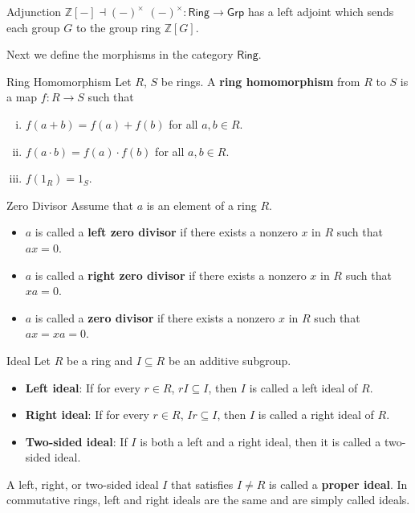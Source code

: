 \begin{proposition}{Adjunction $\mathbb{Z}\left[-\right]\dashv \left(-\right)^\times$}{}
    $(-)^\times:\mathsf{Ring}\to\mathsf{Grp}$ has a left adjoint which sends each group $G$ to the group ring $\mathbb{Z}\left[G\right]$.
\end{proposition}


Next we define the morphisms in the category $\mathsf{Ring}$.
\begin{definition}{Ring Homomorphism}{}
    Let $R$, $S$ be rings. A \textbf{ring homomorphism} from $R$ to $S$ is a map $f:R\to S$ such that
    \begin{enumerate}[(i)]
        \item $f(a+b)=f(a)+f(b)$ for all $a,b\in R$.
        \item $f(a\cdot b)=f(a)\cdot f(b)$ for all $a,b\in R$.
        \item $f(1_R)=1_S$.
    \end{enumerate}
\end{definition}




\begin{definition}{Zero Divisor}{}
    Assume that $a$ is an element of a ring $R$. 
    \begin{itemize}
        \item $a$ is called a \textbf{left zero divisor} if there exists a nonzero $x$ in $R$ such that $ax = 0$.
        \item $a$ is called a \textbf{right zero divisor} if there exists a nonzero $x$ in $R$ such that $xa = 0$.
        \item $a$ is called a \textbf{zero divisor} if there exists a nonzero $x$ in $R$ such that $ax = xa = 0$.
    \end{itemize}
\end{definition}

\begin{definition}{Ideal}{}
    Let \( R \) be a ring and \( I \subseteq R \) be an additive subgroup.
    \begin{itemize}
        \item \textbf{Left ideal}: If for every \( r \in R \), \( rI \subseteq I \), then \( I \) is called a left ideal of \( R \).
        \item \textbf{Right ideal}: If for every \( r \in R \), \( Ir \subseteq I \), then \( I \) is called a right ideal of \( R \).
        \item \textbf{Two-sided ideal}: If \( I \) is both a left and a right ideal, then it is called a two-sided ideal.
    \end{itemize}

A left, right, or two-sided ideal \( I \) that satisfies \( I \ne R \) is called a \textbf{proper ideal}. In commutative rings, left and right ideals are the same and are simply called ideals.
\end{definition}

